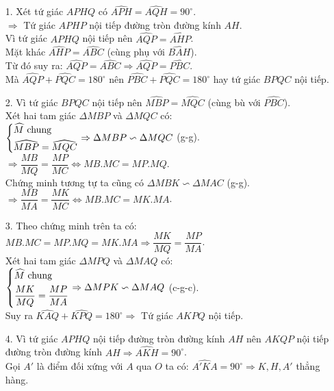 \begin{ex}
{\begin{center}
\begin{tikzpicture}[scale=1]
	\end{tikzpicture}
    \end{center}
    \begin{enumerate}
        \item[1.] Xét tứ giác $APHQ$ có $\widehat{APH}=\widehat{AQH}=90^\circ$.\\
        $\Rightarrow $ Tứ giác $APHP$ nội tiếp đường tròn đường kính $AH$.\\
        Vì tứ giác $APHQ$ nội tiếp nên $\widehat{AQP}=\widehat{AHP}$.\\
        Mặt khác $\widehat{AHP}=\widehat{ABC}$ (cùng phụ với $\widehat{BAH}$).\\
        Từ đó suy ra: $\widehat{AQP}=\widehat{ABC}\Rightarrow \widehat{AQP}=\widehat{PBC}$.\\
        Mà $\widehat{AQP}+\widehat{PQC}=180^\circ$ nên $\widehat{PBC}+\widehat{PQC}=180^\circ$ hay tứ giác $BPQC$ nội tiếp.
        \item[2.] Vì tứ giác $BPQC$ nội tiếp nên $\widehat{MBP}=\widehat{MQC}$ (cùng bù với $\widehat{PBC}$).\\
        Xét hai tam giác $\Delta MBP$ và $\Delta MQC$ có:\\
        $\heva{&\widehat{M} \text{ chung}\\&\widehat{MBP}=\widehat{MQC}}\Rightarrow \Delta MBP\backsim\Delta MQC$ (g-g).\\
      $\Rightarrow \dfrac{MB}{MQ}=\dfrac{MP}{MC}\Leftrightarrow MB.MC=MP.MQ$.\\
      Chứng minh tương tự ta cũng có $\Delta MBK\backsim\Delta MAC$ (g-g).\\
      $\Rightarrow \dfrac{MB}{MA}=\dfrac{MK}{MC}\Leftrightarrow MB.MC=MK.MA$.
        \item[3.] Theo chứng minh trên ta có: $MB.MC=MP.MQ=MK.MA\Rightarrow \dfrac{MK}{MQ}=\dfrac{MP}{MA}$.\\
        Xét hai tam giác $\Delta MPQ$ và $\Delta MAQ$ có:
         $\heva{&\widehat{M} \text{ chung}\\&\dfrac{MK}{MQ}=\dfrac{MP}{MA}}\Rightarrow \Delta MPK\backsim\Delta MAQ$ (c-g-c).\\
         Suy ra $\widehat{KAQ}+\widehat{KPQ}=180^\circ\Rightarrow$ Tứ giác $AKPQ$ nội tiếp.
         \item[4.] Vì tứ giác $APHQ$ nội tiếp đường tròn đường kính $AH$ nên $AKQP$ nội tiếp đường tròn đường kính $AH\Rightarrow \widehat{AKH}=90^\circ$.\\
         Gọi $A'$ là điểm đối xứng với $A$ qua $O$ ta có: $\widehat{A'KA}=90^\circ\Rightarrow K,H,A'$ thẳng hàng.\\

\end{enumerate}}
\end{ex}
